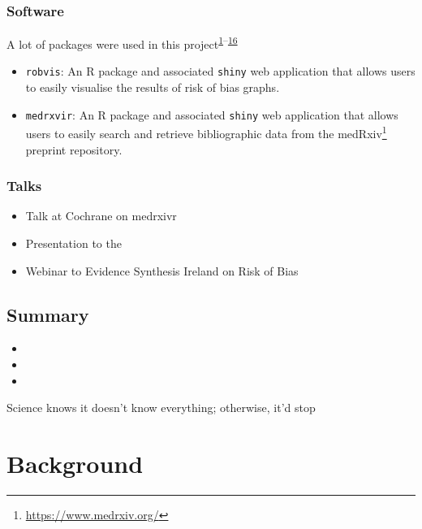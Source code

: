 \documentclass[a4paper, twoside]{templates/ociamthesis}
\providecommand{\tightlist}{%
  \setlength{\itemsep}{0pt}\setlength{\parskip}{0pt}}
\begin{document}
\hypertarget{software}{%
\subsection{Software}\label{software}}

A lot of packages were used in this project\textsuperscript{\protect\hyperlink{ref-base}{1}--\protect\hyperlink{ref-rbiorxiv}{16}}

\begin{itemize}
\item
  \texttt{robvis}: An R package and associated \texttt{shiny} web application that allows users to easily visualise the results of risk of bias graphs.
\item
  \texttt{medrxvir}: An R package and associated \texttt{shiny} web application that allows users to easily search and retrieve bibliographic data from the medRxiv\footnote{\url{https://www.medrxiv.org/}} preprint repository.
\end{itemize}

\hypertarget{talks}{%
\subsection{Talks}\label{talks}}

\begin{itemize}
\tightlist
\item
  Talk at Cochrane on medrxivr
\item
  Presentation to the
\item
  Webinar to Evidence Synthesis Ireland on Risk of Bias
\end{itemize}

\hypertarget{summary}{%
\section{Summary}\label{summary}}

\begin{itemize}
\item
\item
\item
\end{itemize}

\begin{savequote}
Science knows it doesn't know everything; otherwise, it'd stop
\end{savequote}



\hypertarget{background-heading}{%
\chapter{Background}\label{background-heading}}
\end{document}
